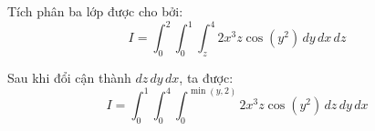 \documentclass{article}
\begin{document}
Tích phân ba lớp được cho bởi:
\[
I = \int_{0}^{2} \int_{0}^{1} \int_{z}^{4} 2x^3 z \cos(y^2) \, dy \, dx \, dz
\]

Sau khi đổi cận thành \( dz\,dy\,dx \), ta được:
\[
I = \int_{0}^{1} \int_{0}^{4} \int_{0}^{\min(y, 2)} 2x^3 z \cos(y^2) \, dz \, dy \, dx
\]
\end{document}
